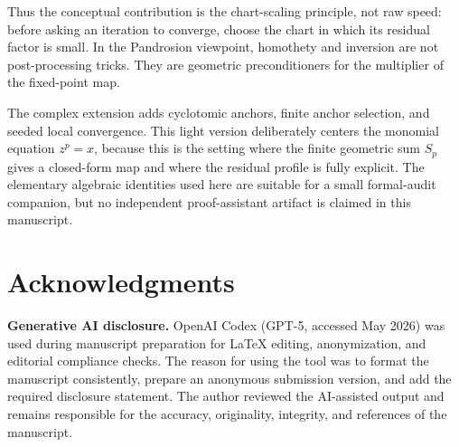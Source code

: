 \documentclass[10pt,a4paper]{article}
\theoremstyle{plain}
\theoremstyle{definition}
\theoremstyle{remark}
\begin{document}
Thus the conceptual contribution is the chart-scaling principle, not raw speed:
before asking an iteration to converge, choose the chart in which its residual
factor is small.  In the Pandrosion viewpoint, homothety and inversion are not
post-processing tricks.  They are geometric preconditioners for the multiplier
of the fixed-point map.

The complex extension adds cyclotomic anchors, finite anchor selection, and
seeded local convergence.  This light version deliberately centers the monomial
equation $z^p=x$, because this is the setting where the finite geometric sum
$S_p$ gives a closed-form map and where the residual profile is fully explicit.
The elementary algebraic identities used here are suitable for a small
formal-audit companion, but no independent proof-assistant artifact is claimed
in this manuscript.

\section*{Acknowledgments}

\textbf{Generative AI disclosure.}
OpenAI Codex (GPT-5, accessed May 2026) was used during manuscript preparation
for LaTeX editing, anonymization, and editorial compliance checks.  The reason
for using the tool was to format the manuscript consistently, prepare an
anonymous submission version, and add the required disclosure statement.  The
author reviewed the AI-assisted output and remains responsible for the accuracy,
originality, integrity, and references of the manuscript.
\end{document}
